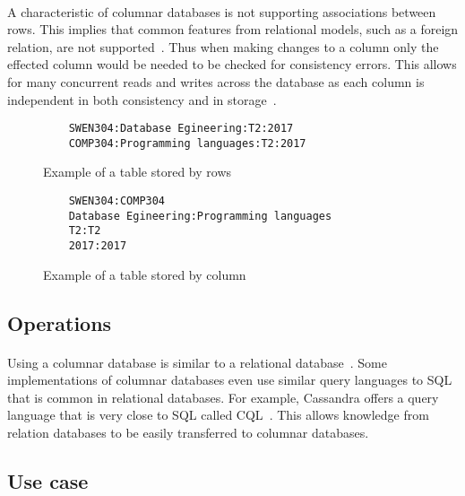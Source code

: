 \documentclass{CRPITStyle}
\renewcommand{\cite}{\citep}
\begin{document}
\paragraph{}
A characteristic of columnar databases is not supporting associations between
rows.
This implies that common features from relational models, such as a foreign relation,
are not supported~\cite{relational_db,nosql_survey}.
Thus when making changes to a column only the effected column would be needed
to be checked for consistency errors.
This allows for many concurrent reads and writes across the database as each
column is independent in both consistency and in storage~\cite{nosql_survey}.


\begin{figure}
\begin{verbatim}
    SWEN304:Database Egineering:T2:2017
    COMP304:Programming languages:T2:2017
\end{verbatim}
\caption{Example of a table stored by rows}
\label{lst:row}
\end{figure}

\begin{figure}
\begin{verbatim}
    SWEN304:COMP304
    Database Egineering:Programming languages
    T2:T2
    2017:2017
\end{verbatim}
\caption{Example of a table stored by column}
\label{lst:column}
\end{figure}

\subsection{Operations}

\paragraph{}
Using a columnar database is similar to a relational database~\cite{usingcolumn}.
Some implementations of columnar databases even use similar query languages to
SQL that is common in relational databases.
For example, Cassandra offers a query language that is very close to
SQL called CQL~\cite{cassandra}.
This allows knowledge from relation databases to be easily transferred to
columnar databases.

\subsection{Use case}
\end{document}

